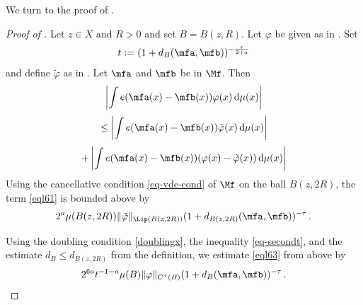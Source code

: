We turn to the proof of .
\begin{proof}[Proof of ]
Let $z\in X$ and $R>0$ and set $B=B(z,R)$. Let $\varphi$
be given as in .
Set
\begin{equation}\label{eql69}
    t:=(1+d_B(\mfa,\mfb))^{-\frac{\tau}{2+a}}
\end{equation}
and define $\tilde{\varphi}$ as in . Let $\mfa$ and $\mfb$ be in $\Mf$.
Then
   \begin{equation}\label{eql60}
       \left|\int e(\mfa(x)-{\mfb(x)}) \varphi (x)\, \mathrm{d}\mu(x)\right|
   \end{equation}
    \begin{equation}\label{eql61}
   \le \left|\int e(\mfa(x)-{\mfb(x)}) \tilde{\varphi} (x)\, \mathrm{d}\mu(x)\right|
   \end{equation}
         \begin{equation}\label{eql62}
     + \left|\int e(\mfa(x)-{\mfb(x)}) (\varphi (x)-\tilde{\varphi}(x))\, \mathrm{d}\mu(x)\right|
   \end{equation}
Using the cancellative condition \eqref{eq-vdc-cond} of $\Mf$ on the ball $B(z,2R)$, the term \eqref{eql61} is bounded above by
 \begin{equation}\label{eql63}
       2^a \mu(B(z,2R)) \|\tilde{\varphi}\|_{\Lip(B(z,2R))} (1 + d_{B(z,2R)}(\mfa,\mfb))^{-\tau} \, .
 \end{equation}



Using the doubling condition \eqref{doublingx},
the inequality \eqref{eq-secondt}, and the estimate
$d_B\le d_{B(z,2R)}$ from the definition,
we estimate \eqref{eql63} from above by
\begin{equation}\label{eql64}
       2^{6a}t^{-1-a} \mu(B) \|{\varphi}\|_{C^\tau(B)}
       (1 + d_{B}(\mfa,\mfb))^{-\tau} \, .
 \end{equation}


\end{proof}
